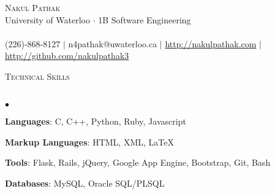 \documentclass[10pt]{article}
\newcommand{\lineunder}{\vspace*{-8pt} \\ \hspace*{-18pt} \hrulefill \\}
\newcommand{\header}[1]{{\hspace*{-15pt}\vspace*{6pt} \textsc{#1}} \vspace*{-6pt} \lineunder}
\newenvironment{achievements}{\begin{list}{$\bullet$}{\topsep 0pt \itemsep -1.5pt \leftmargin 5pt}}{\vspace*{4pt}\end{list}}
\begin{document}
\small
\smallskip
\vspace*{-45pt}

\begin{center}
	{\Huge \scshape {Nakul Pathak}} \\
\vspace*{6pt} 
{\fontsize{10}{1}\selectfont University of Waterloo $\cdot$ 1B Software Engineering} \\
\vspace{-4pt}
\hspace*{-18pt} \hrulefill \\
\vspace{2pt}
\hspace*{-18pt} (226)-868-8127 $|$ n4pathak@uwaterloo.ca $|$ \url{http://nakulpathak.com} $|$  \url{http://github.com/nakulpathak3}
\vspace{-5pt}
\end{center}


\vspace{5pt}
\header{\normalsize Technical Skills}
\begin{achievements}
\item \textbf{Languages}: C, C++, Python, Ruby, Javascript
\item \textbf{Markup Languages}: HTML, XML, LaTeX
\item \textbf{Tools}: Flask, Rails, jQuery, Google App Engine, Bootstrap, Git, Bash
\item \textbf{Databases}: MySQL, Oracle SQL/PLSQL
\end{achievements}

\vspace{5pt}
\end{document}
